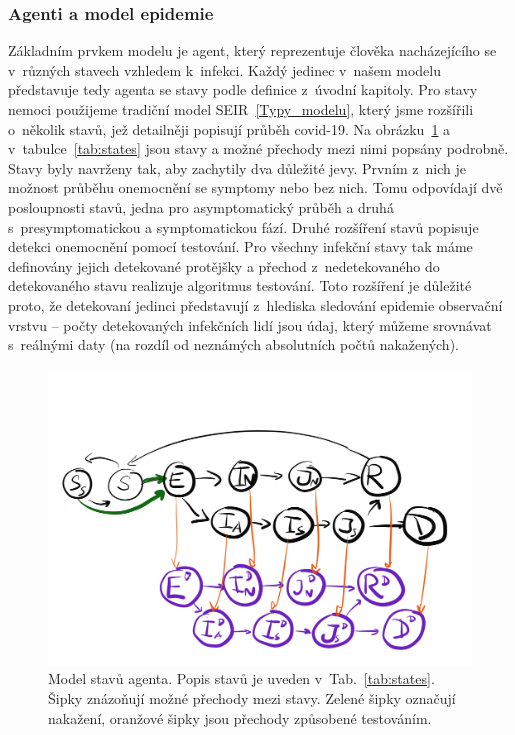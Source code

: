 \subsubsection*{Agenti a model epidemie}

Základním prvkem modelu je agent, který reprezentuje člověka nacházejícího se v~různých stavech vzhledem k~infekci. Každý jedinec v~našem modelu představuje tedy agenta se stavy podle definice z~úvodní kapitoly. Pro stavy nemoci použijeme tradiční model SEIR~\ref{Typy_modelu}, který jsme rozšířili o~několik stavů, jež detailněji popisují průběh covid-19. Na obrázku~\ref{fig:model-states} a v~tabulce~\ref{tab:states} jsou stavy a možné přechody mezi nimi popsány podrobně. Stavy byly navrženy tak, aby zachytily dva důležité jevy. Prvním z~nich je možnost průběhu onemocnění se symptomy nebo bez nich. Tomu odpovídají dvě posloupnosti stavů, jedna pro asymptomatický průběh a druhá s~presymptomatickou a symptomatickou fází. Druhé rozšíření stavů popisuje detekci onemocnění pomocí testování. Pro všechny infekční stavy tak máme definovány jejich detekované protějšky a přechod z~nedetekovaného do detekovaného stavu realizuje algoritmus testování. Toto rozšíření je důležité proto, že detekovaní jedinci představují z~hlediska sledování epidemie observační vrstvu -- počty detekovaných infekčních lidí jsou údaj, který můžeme srovnávat s~reálnými daty (na rozdíl od neznámých absolutních počtů nakažených).

    

\begin{figure}%
\centerline{%
\includegraphics[width=0.99\columnwidth]{pic/epi08}%
}
\caption{Model stavů agenta. Popis stavů je uveden v~Tab.~\ref{tab:states}. Šipky znázoňují možné přechody mezi stavy. Zelené šipky označují nakažení, oranžové šipky jsou přechody způsobené testováním.}%
\label{fig:model-states}%
\end{figure}


